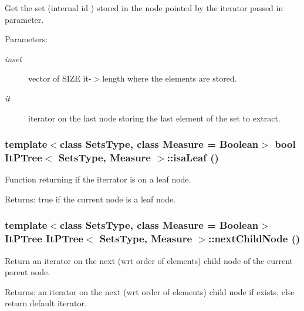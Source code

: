 Get the set (internal id ) stored in the node pointed by the iterator passed in parameter. 

\begin{Desc}
\item[Parameters:]
\begin{description}
\item[{\em inset}]vector of SIZE it-$>$length where the elements are stored. \item[{\em it}]iterator on the last node storing the last element of the set to extract. \end{description}
\end{Desc}
\subsubsection{\setlength{\rightskip}{0pt plus 5cm}template$<$class Sets\-Type, class Measure = Boolean$>$ bool {\bf It\-PTree}$<$ Sets\-Type, Measure $>$::isa\-Leaf ()\hspace{0.3cm}{\tt  [inline]}}\label{class_it_p_tree_b47274ccede2e15f5248e94fe19b81e0}


Function returning if the iterrator is on a leaf node. 

\begin{Desc}
\item[Returns:]true if the current node is a leaf node. \end{Desc}
\subsubsection{\setlength{\rightskip}{0pt plus 5cm}template$<$class Sets\-Type, class Measure = Boolean$>$ {\bf It\-PTree} {\bf It\-PTree}$<$ Sets\-Type, Measure $>$::next\-Child\-Node ()\hspace{0.3cm}{\tt  [inline]}}\label{class_it_p_tree_393c897eec99dd8c5aaac7bf76b61733}


Return an iterator on the next (wrt order of elements) child node of the current parent node. 

\begin{Desc}
\item[Returns:]an iterator on the next (wrt order of elements) child node if exists, else return default iterator. \end{Desc}
